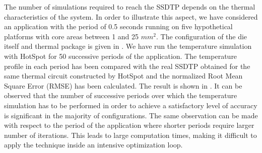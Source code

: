 The number of simulations required to reach the SSDTP depends on the thermal characteristics of the system. In order to illustrate this aspect, we have considered an application with the period of 0.5 seconds running on five hypothetical platforms with core areas between 1 and 25 $mm^2$. The configuration of the die itself and thermal package is given in . We have run the temperature simulation with HotSpot \cite{huang2006} for 50 successive periods of the application. The temperature profile in each period has been compared with the real SSDTP obtained for the same thermal circuit constructed by HotSpot and the normalized Root Mean Square Error (RMSE) has been calculated. The result is shown in . It can be observed that the number of successive periods over which the temperature simulation has to be performed in order to achieve a satisfactory level of accuracy is significant in the majority of configurations. The same observation can be made with respect to the period of the application where shorter periods require larger number of iterations. This leads to large computation times, making it difficult to apply the technique inside an intensive optimization loop.

